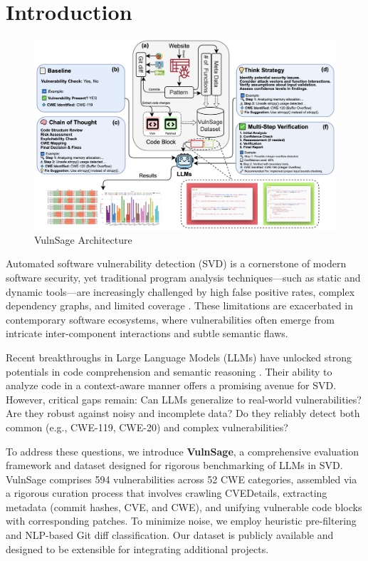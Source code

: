 \documentclass[sigconf,review,anonymous]{acmart}
\begin{document}
\section{Introduction}
\begin{figure}[htbp]
    \centering
    \includegraphics[width=1.0\linewidth]{landing2.png}
    \caption{VulnSage Architecture}
    \label{figure:framework}
\end{figure}

Automated software vulnerability detection (SVD) is a cornerstone of modern software security, yet traditional program analysis techniques—such as static and dynamic tools—are increasingly challenged by high false positive rates, complex dependency graphs, and limited coverage \cite{manes2019art, klees2018evaluating, pereira2021machine, li2024llm}. These limitations are exacerbated in contemporary software ecosystems, where vulnerabilities often emerge from intricate inter-component interactions and subtle semantic flaws.

Recent breakthroughs in Large Language Models (LLMs) \cite{chen2021evaluating, dubey2024llama, guo2025deepseek} have unlocked strong potentials in code comprehension and semantic reasoning \cite{guo2024deepseek, roziere2023code}. Their ability to analyze code in a context-aware manner offers a promising avenue for SVD. However, critical gaps remain: Can LLMs generalize to real-world vulnerabilities? Are they robust against noisy and incomplete data? Do they reliably detect both common (e.g., CWE-119, CWE-20) and complex vulnerabilities?

To address these questions, we introduce \textbf{VulnSage}, a comprehensive evaluation framework and dataset designed for rigorous benchmarking of LLMs in SVD. VulnSage comprises 594 vulnerabilities across 52 CWE categories, assembled via a rigorous curation process that involves crawling CVEDetails, extracting metadata (commit hashes, CVE, and CWE), and unifying vulnerable code blocks with corresponding patches. To minimize noise, we employ heuristic pre-filtering and NLP-based Git diff classification. Our dataset is publicly available and designed to be extensible for integrating additional projects.
\end{document}
